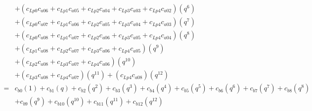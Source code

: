 \documentclass[12pt]{article}
\begin{document}
\begin{align}
    &+ (c_{Lp0}c_{a06} + c_{Lp1}c_{a05} + c_{Lp2}c_{a04} + c_{Lp3}c_{a03} + c_{Lp4}c_{a02})(q^6) \nonumber\\
    &+ (c_{Lp0}c_{a07} + c_{Lp1}c_{a06} + c_{Lp2}c_{a05} + c_{Lp3}c_{a04} + c_{Lp4}c_{a03})(q^7) \nonumber\\
    &+ (c_{Lp0}c_{a08} + c_{Lp1}c_{a07} +  c_{Lp2}c_{a06} + c_{Lp3}c_{a05} + c_{Lp4}c_{a04})(q^8) \nonumber\\
    &+ (c_{Lp1}c_{a08} + c_{Lp2}c_{a07} + c_{Lp3}c_{a06} + c_{Lp4}c_{a05})(q^9) \nonumber\\
    &+ (c_{Lp2}c_{a08} + c_{Lp3}c_{a07} + c_{Lp4}c_{a06})(q^{10}) \nonumber\\
    &+ (c_{Lp3}c_{a08} + c_{Lp4}c_{a07})(q^{11}) + (c_{Lp4}c_{a08})(q^{12})\\
    =& c_{b0}(1)  + c_{b1}(q) + c_{b2}(q^2) + c_{b3}(q^3) + c_{b4}(q^4) + c_{b5}(q^5) + c_{b6}(q^6) + c_{b7}(q^7) + c_{b8}(q^8) \nonumber\\
    &+ c_{b9}(q^9) + c_{b10}(q^{10}) + c_{b11}(q^{11}) + c_{b12}(q^{12})
\end{align}
\end{document}
